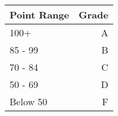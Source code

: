 \documentclass[letterpaper,12pt]{article}
\begin{document}
\begin{center}
  \begin{tabular}{ | l | r | }
    \hline
    \textbf{Point Range} & \textbf{Grade} \\ \hline
    100+ & A \\ \hline
    85 - 99 & B \\ \hline
    70 - 84 & C \\ \hline
    50 - 69 & D \\ \hline
    Below 50 & F \\ \hline

  \end{tabular}
\end{center}
\end{document}
